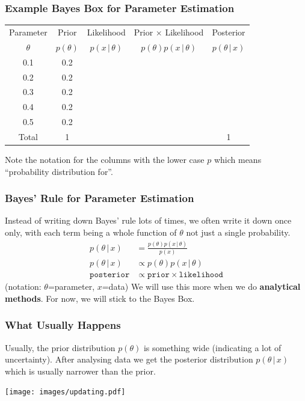 \documentclass{beamer}
\newcommand{\given}{\,|\,}
\begin{document}
\begin{frame}
\frametitle{Example Bayes Box for Parameter Estimation}
\begin{tabular}{|c|c|c|c|c|}
\hline
Parameter & Prior & Likelihood & Prior $\times$ Likelihood & Posterior \\
$\theta$  & $p(\theta)$ & $p(x \given \theta)$ & $p(\theta)p(x\given\theta)$ & $p(\theta\given x)$ \\
\hline
0.1 & 0.2  &  & & \\
0.2 & 0.2  &  & & \\
0.3 & 0.2 &  & & \\
0.4 & 0.2  &  & & \\
0.5 & 0.2 & & & \\
\hline
Total & 1 & & & 1 \\
\hline
\end{tabular}
\pause
\vspace{1em}

Note the notation for the columns with the lower case $p$
which means ``probability distribution for''.


\end{frame}


\begin{frame}
\frametitle{Bayes' Rule for Parameter Estimation}
Instead of writing down Bayes' rule lots of times, we often write it down
once only, with each term being a whole function of $\theta$ not just
a single probability.\pause
\begin{align}
p(\theta \given x) &= \frac{p(\theta)p(x \given \theta)}{p(x)} \\
p(\theta \given x) &\propto p(\theta)p(x \given \theta) \\
\texttt{posterior} &\propto \texttt{prior} \times \texttt{likelihood}
\end{align}
\pause
(notation: $\theta$=parameter, $x$=data)
We will use this more when we do {\bf analytical methods}. For now, we will
stick to the Bayes Box.


\end{frame}


\begin{frame}
\frametitle{What Usually Happens}
Usually, the prior distribution $p(\theta)$ is something wide (indicating
a lot of uncertainty). After analysing data we get the posterior distribution
$p(\theta \given x)$ which is usually narrower than the prior.

\begin{center}
\texttt{[image: images/updating.pdf]}
\end{center}

\end{frame}
\end{document}
